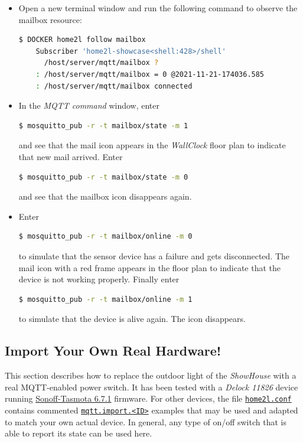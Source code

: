 \documentclass[12pt,english,parskip=half,headheight=19pt]{scrreprt}
\newcommand{\idx}[1]{#1\index{#1}}
\newcommand{\refenv}[1]{\hyperref[env:#1]{\texttt{#1}}}        %
\newcommand{\reftool}[1]{\hyperref[tool:#1]{\texttt{\idx{#1}}}}
\begin{document}
\begin{itemize}[$\blacktriangleright$]

\item
  Open a new terminal window and run the following command to observe the mailbox resource:
  \begin{lstlisting}[language=bash]
    $ DOCKER home2l follow mailbox
    Subscriber 'home2l-showcase<shell:428>/shell'
      /host/server/mqtt/mailbox ?
    : /host/server/mqtt/mailbox = 0 @2021-11-21-174036.585
    : /host/server/mqtt/mailbox connected
  \end{lstlisting}

\item
  In the \textit{MQTT command} window, enter
  \begin{lstlisting}[language=bash]
    $ mosquitto_pub -r -t mailbox/state -m 1
  \end{lstlisting}
  and see that the mail icon appears in the \textit{WallClock} floor plan to indicate that new mail arrived.
  Enter
  \begin{lstlisting}[language=bash]
    $ mosquitto_pub -r -t mailbox/state -m 0
  \end{lstlisting}
  and see that the mailbox icon disappears again.

\item
  Enter
  \begin{lstlisting}[language=bash]
    $ mosquitto_pub -r -t mailbox/online -m 0
  \end{lstlisting}
  to simulate that the sensor device has a failure and gets disconnected. The mail icon with a red frame
  appears in the floor plan to indicate that the device is not working properly.
  Finally enter
  \begin{lstlisting}[language=bash]
    $ mosquitto_pub -r -t mailbox/online -m 1
  \end{lstlisting}
  to simulate that the device is alive again. The icon disappears.

\end{itemize}



\subsection{Import Your Own Real Hardware!}
\label{sec:tutorial-mqtt-real}

This section describes how to replace the outdoor light of the \textit{ShowHouse} with a real MQTT-enabled power switch. It has been tested with a \textit{Delock 11826} device running \href{https://tasmota.github.io/docs}{Sonoff-Tasmota 6.7.1} firmware. For other devices, the file \reftool{home2l.conf} contains commented \refenv{mqtt.import.<ID>} examples that may be used and adapted to match your own actual device. In general, any type of on/off switch that is able to report its state can be used here.
\end{document}
